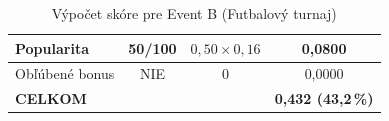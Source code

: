 \begin{table}[H]
\begin{tabular}{|l|c|c|c|}
  \hline                                                                                                                                                                                                                            
  Popularita & 50/100 & $0{,}50 \times 0{,}16$ & 0,0800 \\                                                                                                                                                                          
  \hline                                                                                                                                                                                                                            
  Obľúbené bonus & NIE & $0$ & 0,0000 \\                                                                                                                                                                                            
  \hline                                                                                                                                                                                                                            
  \textbf{CELKOM} & & & \textbf{0,432 (43,2\,\%)} \\                                                                                                                                                                                
  \hline                                                                                                                                                                                                                            
  \end{tabular}
  \caption{Výpočet skóre pre Event B (Futbalový turnaj)}
  \end{table}

